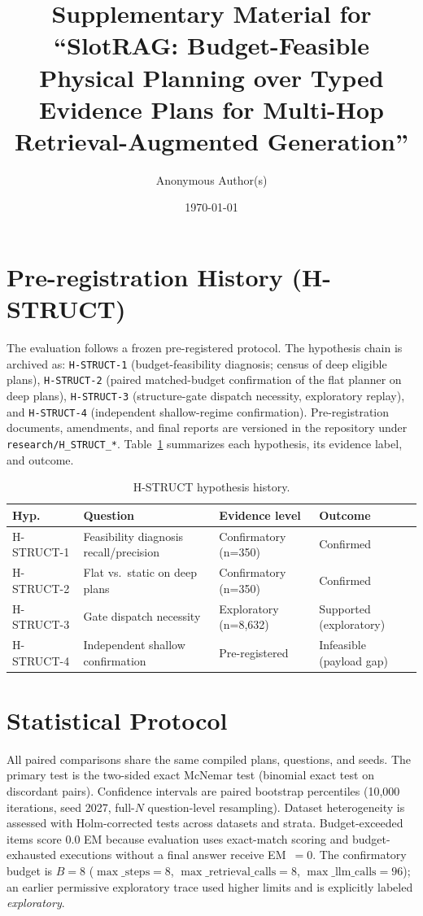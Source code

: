 \documentclass[11pt,a4paper]{article}
\title{Supplementary Material for\\
``SlotRAG: Budget-Feasible Physical Planning over Typed Evidence Plans for Multi-Hop Retrieval-Augmented Generation''}
\author{Anonymous Author(s)}
\date{\today}
\begin{document}
\maketitle

\section{Pre-registration History (H-STRUCT)} \label{sec:hstruct}

The evaluation follows a frozen pre-registered protocol. The hypothesis chain
is archived as: \texttt{H-STRUCT-1} (budget-feasibility diagnosis; census of
deep eligible plans), \texttt{H-STRUCT-2} (paired matched-budget confirmation
of the flat planner on deep plans), \texttt{H-STRUCT-3} (structure-gate
dispatch necessity, exploratory replay), and \texttt{H-STRUCT-4}
(independent shallow-regime confirmation). Pre-registration documents,
amendments, and final reports are versioned in the repository under
\texttt{research/H\_STRUCT\_*}. Table~\ref{tab:hstruct} summarizes each
hypothesis, its evidence label, and outcome.

\begin{table}[h]
\centering\small
\begin{tabular}{llll}
\toprule
\textbf{Hyp.} & \textbf{Question} & \textbf{Evidence level} & \textbf{Outcome} \\
\midrule
H-STRUCT-1 & Feasibility diagnosis recall/precision & Confirmatory (n=350) & Confirmed \\
H-STRUCT-2 & Flat vs.\ static on deep plans & Confirmatory (n=350) & Confirmed \\
H-STRUCT-3 & Gate dispatch necessity & Exploratory (n=8,632) & Supported (exploratory) \\
H-STRUCT-4 & Independent shallow confirmation & Pre-registered & Infeasible (payload gap) \\
\bottomrule
\end{tabular}
\caption{H-STRUCT hypothesis history.}
\label{tab:hstruct}
\end{table}

\section{Statistical Protocol} \label{sec:stats}

All paired comparisons share the same compiled plans, questions, and seeds.
The primary test is the two-sided exact McNemar test (binomial exact test on
discordant pairs). Confidence intervals are paired bootstrap percentiles
(10{,}000 iterations, seed 2027, full-$N$ question-level resampling). Dataset
heterogeneity is assessed with Holm-corrected tests across datasets and
strata. Budget-exceeded items score 0.0 EM because evaluation uses
exact-match scoring and budget-exhausted executions without a final answer
receive EM~$=0$. The confirmatory budget is $B=8$
($\max\_\mathrm{steps}=8$, $\max\_\mathrm{retrieval\_calls}=8$,
$\max\_\mathrm{llm\_calls}=96$); an earlier permissive exploratory trace used
higher limits and is explicitly labeled \emph{exploratory}.
\end{document}
